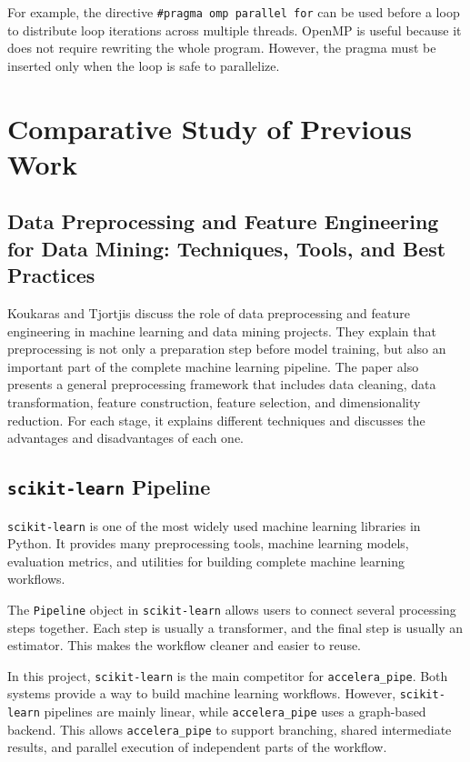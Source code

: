 \documentclass[12pt,a4paper]{report}
\begin{document}
For example, the directive \texttt{\#pragma omp parallel for} can be used before
a loop to distribute loop iterations across multiple threads. OpenMP is useful
because it does not require rewriting the whole program. However, the pragma must
be inserted only when the loop is safe to parallelize.

\newpage

\section{Comparative Study of Previous Work}
\mbox{}

\subsection{Data Preprocessing and Feature Engineering for Data Mining:
Techniques, Tools, and Best Practices ~\cite{paraskevas2025data}}
Koukaras and Tjortjis discuss the role of data preprocessing and feature
engineering in machine learning and data mining projects. They explain that
preprocessing is not only a preparation step before model training, but also an
important part of the complete machine learning pipeline. The paper also
presents a general preprocessing framework that includes data cleaning, data
transformation, feature construction, feature selection, and dimensionality
reduction. For each stage, it explains different techniques and discusses the
advantages and disadvantages of each one.


\subsection{\texttt{scikit-learn} Pipeline}
\texttt{scikit-learn} is one of the most widely used machine learning libraries
in Python. It provides many preprocessing tools, machine learning models,
evaluation metrics, and utilities for building complete machine learning
workflows.

The \texttt{Pipeline} object in \texttt{scikit-learn} allows users to connect
several processing steps together. Each step is usually a transformer, and the
final step is usually an estimator. This makes the workflow cleaner and easier
to reuse.

In this project, \texttt{scikit-learn} is the main competitor for
\texttt{accelera\_pipe}. Both systems provide a way to build machine learning
workflows. However, \texttt{scikit-learn} pipelines are mainly linear, while
\texttt{accelera\_pipe} uses a graph-based backend. This allows
\texttt{accelera\_pipe} to support branching, shared intermediate results, and
parallel execution of independent parts of the workflow.
\end{document}
